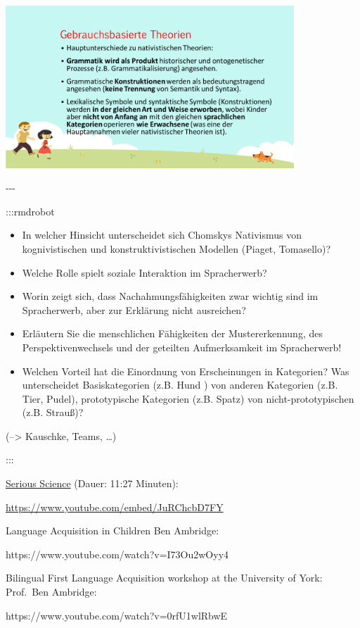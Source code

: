 \documentclass[
  letterpaper,
]{scrbook}
\begin{document}
\includegraphics[width=4.27in,height=\textheight]{./pictures/muster_intentionen/Diapozitiv9.PNG}

-\/-\/-

\hfill\break
:::rmdrobot

\begin{itemize}
\item
  In welcher Hinsicht unterscheidet sich Chomskys Nativismus von
  kognivistischen und konstruktivistischen Modellen (Piaget, Tomasello)?
\item
  Welche Rolle spielt soziale Interaktion im Spracherwerb?
\item
  Worin zeigt sich, dass Nachahmungsfähigkeiten zwar wichtig sind im
  Spracherwerb, aber zur Erklärung nicht ausreichen?
\item
  Erläutern Sie die menschlichen Fähigkeiten der Mustererkennung, des
  Perspektivenwechsels und der geteilten Aufmerksamkeit im Spracherwerb!
\item
  Welchen Vorteil hat die Einordnung von Erscheinungen in Kategorien?
  Was unterscheidet Basiskategorien (z.B. Hund ) von anderen Kategorien
  (z.B. Tier, Pudel), prototypische Kategorien (z.B. Spatz) von
  nicht-prototypischen (z.B. Strauß)?
\end{itemize}

(--\textgreater{} Kauschke, Teams, \ldots)

:::

\href{https://www.youtube.com/watch?v=JuRChcbD7FY}{Serious Science}
(Dauer: 11:27 Minuten):

\url{https://www.youtube.com/embed/JuRChcbD7FY}

Language Acquisition in Children Ben Ambridge:

https://www.youtube.com/watch?v=I73Ou2wOyy4

Bilingual First Language Acquisition workshop at the University of York:
Prof.~Ben Ambridge:

https://www.youtube.com/watch?v=0rfU1wlRbwE
\end{document}
